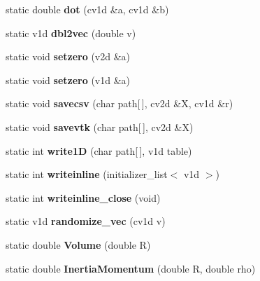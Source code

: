 \begin{DoxyCompactItemize}
\mbox{\label{classTools_aa44320b613c01d074088c5efb08f90f9}} 
static double {\bfseries dot} (cv1d \&a, cv1d \&b)
\item 
\mbox{\label{classTools_afb2ccc2c0d845a63e5f524de6cd3633c}} 
static v1d {\bfseries dbl2vec} (double v)
\item 
\mbox{\label{classTools_a05197e1b3bf0c76b41f533eb1cb023b2}} 
static void {\bfseries setzero} (v2d \&a)
\item 
\mbox{\label{classTools_a8a5f2d0d6f559b59daf7050dd76fffc9}} 
static void {\bfseries setzero} (v1d \&a)
\item 
\mbox{\label{classTools_aa23ec664202e594d17c616534e9d715b}} 
static void {\bfseries savecsv} (char path\mbox{[}$\,$\mbox{]}, cv2d \&X, cv1d \&r)
\item 
\mbox{\label{classTools_ac51c46b091be2b0bf8583caea5320916}} 
static void {\bfseries savevtk} (char path\mbox{[}$\,$\mbox{]}, cv2d \&X)
\item 
\mbox{\label{classTools_af15f92dafc5956d665f60f4740edf25e}} 
static int {\bfseries write1D} (char path\mbox{[}$\,$\mbox{]}, v1d table)
\item 
\mbox{\label{classTools_a1b1ebbd661cc507f0f0064dc2022cd10}} 
static int {\bfseries writeinline} (initializer\+\_\+list$<$ v1d $>$)
\item 
\mbox{\label{classTools_a322fda69fee883253d7476a0d87384d2}} 
static int {\bfseries writeinline\+\_\+close} (void)
\item 
\mbox{\label{classTools_ab915f7795f9a2e308a857fd4fc799fce}} 
static v1d {\bfseries randomize\+\_\+vec} (cv1d v)
\item 
\mbox{\label{classTools_a2afdf8466fa193a3f8d1ad27f68f774a}} 
static double {\bfseries Volume} (double R)
\item 
\mbox{\label{classTools_a7a4f640bef8c8a2bef3f6f19fe9ca787}} 
static double {\bfseries Inertia\+Momentum} (double R, double rho)

\end{DoxyCompactItemize}
